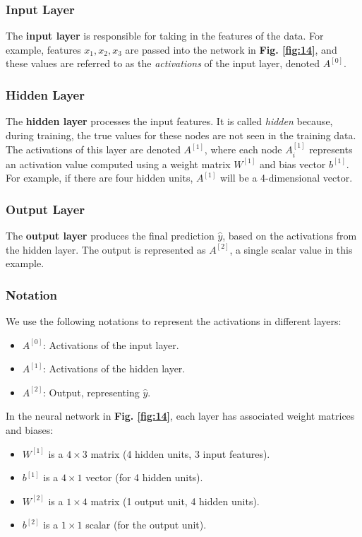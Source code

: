 \documentclass[letterpaper,12pt,notitlepage,twoside]{report}
\begin{document}
\subsubsection{Input Layer}
The \textbf{input layer} is responsible for taking in the features of the data. For example, features \( x_1, x_2, x_3 \) are passed into the network in \textbf{Fig. \ref{fig:14}}, and these values are referred to as the \textit{activations} of the input layer, denoted \( A^{[0]} \).

\subsubsection{Hidden Layer}
The \textbf{hidden layer} processes the input features. It is called \textit{hidden} because, during training, the true values for these nodes are not seen in the training data. The activations of this layer are denoted \( A^{[1]} \), where each node \( A^{[1]}_i \) represents an activation value computed using a weight matrix \( W^{[1]} \) and bias vector \( b^{[1]} \). For example, if there are four hidden units, \( A^{[1]} \) will be a 4-dimensional vector.

\subsubsection{Output Layer}
The \textbf{output layer} produces the final prediction \( \hat{y} \), based on the activations from the hidden layer. The output is represented as \( A^{[2]} \), a single scalar value in this example.

\subsubsection{Notation}
We use the following notations to represent the activations in different layers:
\begin{itemize}
    \item \( A^{[0]} \): Activations of the input layer.
    \item \( A^{[1]} \): Activations of the hidden layer.
    \item \( A^{[2]} \): Output, representing \( \hat{y} \).
\end{itemize}

In the neural network in \textbf{Fig. \ref{fig:14}}, each layer has associated weight matrices and biases:
\begin{itemize}
    \item \( W^{[1]} \) is a \( 4 \times 3 \) matrix (4 hidden units, 3 input features).
    \item \( b^{[1]} \) is a \( 4 \times 1 \) vector (for 4 hidden units).
    \item \( W^{[2]} \) is a \( 1 \times 4 \) matrix (1 output unit, 4 hidden units).
    \item \( b^{[2]} \) is a \( 1 \times 1 \) scalar (for the output unit).
\end{itemize}
\end{document}
